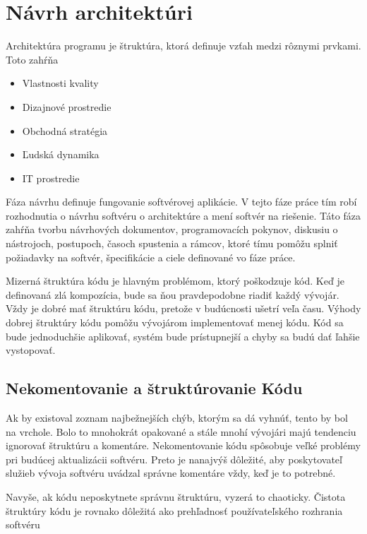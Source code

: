 \documentclass[10pt,twoside,slovak,a4paper]{article}
\begin{document}

\section{Návrh architektúri}
Architektúra programu je štruktúra, ktorá definuje vzťah medzi rôznymi prvkami. Toto zahŕňa

\begin{itemize}
\item Vlastnosti kvality
\item Dizajnové prostredie
\item Obchodná stratégia
\item Ľudská dynamika
\item IT prostredie
\end{itemize}

Fáza návrhu definuje fungovanie softvérovej aplikácie. V tejto fáze práce tím robí rozhodnutia o návrhu softvéru o architektúre a mení softvér na riešenie. Táto fáza zahŕňa tvorbu návrhových dokumentov, programovacích pokynov, diskusiu o nástrojoch, postupoch, časoch spustenia a rámcov, ktoré tímu pomôžu splniť požiadavky na softvér, špecifikácie a ciele definované vo fáze práce.\cite{VyvojProces3}




Mizerná štruktúra kódu je hlavným problémom, ktorý poškodzuje kód. Keď je definovaná zlá kompozícia, bude sa ňou pravdepodobne riadiť každý vývojár. Vždy je dobré mať štruktúru kódu, pretože v budúcnosti ušetrí veľa času. Výhody dobrej štruktúry kódu pomôžu vývojárom implementovať menej kódu. Kód sa bude jednoduchšie aplikovať, systém bude prístupnejší a chyby sa budú dať ľahšie vystopovať.

\subsection{Nekomentovanie a štruktúrovanie Kódu}

Ak by existoval zoznam najbežnejších chýb, ktorým sa dá vyhnúť, tento by bol na vrchole. Bolo to mnohokrát opakované a stále mnohí vývojári majú tendenciu ignorovať štruktúru a komentáre. Nekomentovanie kódu spôsobuje veľké problémy pri budúcej aktualizácii softvéru. Preto je nanajvýš dôležité, aby poskytovateľ služieb vývoja softvéru uvádzal správne komentáre vždy, keď je to potrebné.

Navyše, ak kódu neposkytnete správnu štruktúru, vyzerá to chaoticky. Čistota štruktúry kódu je rovnako dôležitá ako prehľadnosť používateľského rozhrania softvéru
\end{document}
